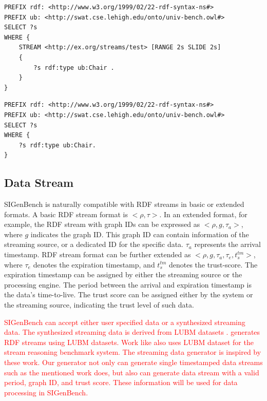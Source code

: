 \begin{lstlisting}[language=SPARQL,caption={CQELS Query Example},basicstyle=\small,frame=single]
PREFIX rdf: <http://www.w3.org/1999/02/22-rdf-syntax-ns#>
PREFIX ub: <http://swat.cse.lehigh.edu/onto/univ-bench.owl#>
SELECT ?s 
WHERE { 
	STREAM <http://ex.org/streams/test> [RANGE 2s SLIDE 2s] 
	{ 
    	?s rdf:type ub:Chair . 
    } 
}
\end{lstlisting}

\begin{lstlisting}[language=SPARQL, caption={Parsed Standard SPARQL Query},basicstyle=\small,frame=single]
PREFIX rdf: <http://www.w3.org/1999/02/22-rdf-syntax-ns#>
PREFIX ub: <http://swat.cse.lehigh.edu/onto/univ-bench.owl#>
SELECT ?s
WHERE {	
	?s rdf:type ub:Chair.
}
\end{lstlisting}
%
\subsection{Data Stream}
SIGenBench is naturally compatible with RDF streams in basic or extended formats.
A basic RDF stream format is $<\rho, \tau>$.
In an extended format, for example, the RDF stream with graph IDs can be expressed as $<\rho, g, \tau_{a}>$, where $g$ indicates the graph ID. 
This graph ID can contain information of the streaming source, or a dedicated ID for the specific data. 
$\tau_{a}$ represents the arrival timestamp. 
RDF stream format can be further extended as $<\rho, g, \tau_{a}, \tau_{e}, t^{tm}_{s}>$, where $\tau_{e}$ denotes the expiration timestamp, and $t^{tm}_{s}$ denotes the trust-score.
The expiration timestamp can be assigned by either the streaming source or the processing engine.
The period between the arrival and expiration timestamp is the data's time-to-live. 
The trust score can be assigned either by the system or the streaming source, indicating the trust level of such data. 

\textcolor{red}{
SIGenBench can accept either user specified data or a synthesized streaming data.
The synthesized streaming data is derived from LUBM datasets \cite{guo2005lubm}. 
\cite{DBLP:conf/semweb/NguyenS13} generates RDF streams using LUBM datasets.
Work like \cite{tommasini2015heaven} also uses LUBM dataset for the stream reasoning benchmark system.
The streaming data generator is inspired by these work. 
Our generator not only can generate single timestamped data streams such as the mentioned work does, but also can generate data stream with a valid period, graph ID, and trust score.
These information will be used for data processing in SIGenBench.
}

